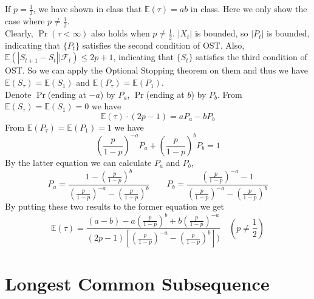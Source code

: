 \documentclass[12pt,letterpaper]{article}
\begin{document}
\subsection{}
If $p=\frac{1}{2}$, we have shown in class that $\mathbb{E}(\tau)=ab$ in class.
Here we only show the case where $p\neq\frac{1}{2}$.\\
Clearly, $\Pr(\tau<\infty)$ also holds when $p\neq\frac{1}{2}$. 
$|X_t|$ is bounded, so $|P_t|$ is bounded,
indicating that $\{P_t\}$ satisfies the second condition of OST.
Also, $\mathbb{E}(|S_{t+1}-S_{t}||\mathcal{F}_t)\leq 2p+1$,
indicating that $\{S_t\}$ satisfies the third condition of OST.
So we can apply the Optional Stopping theorem on them and thus we have
$\mathbb{E}(S_{\tau})=\mathbb{E}(S_{1})$ and $\mathbb{E}(P_{\tau})=\mathbb{E}(P_{1})$.\\
Denote $\Pr$(ending at $-a$) by $P_a$, $\Pr$(ending at $b$) by $P_b$.
From $\mathbb{E}(S_{\tau})=\mathbb{E}(S_{1})=0$ we have 
$$\mathbb{E}(\tau)\cdot(2p-1)=aP_a-bP_b$$
From $\mathbb{E}(P_{\tau})=\mathbb{E}(P_{1})=1$ we have
$$\left(\frac{p}{1-p}\right)^{-a}P_a+\left(\frac{p}{1-p}\right)^{b}P_b=1$$
By the latter equation we can calculate $P_a$ and $P_b$,
$$P_a=\frac{1-\left(\frac{p}{1-p}\right)^b}{\left(\frac{p}{1-p}\right)^{-a}-\left(\frac{p}{1-p}\right)^b}\qquad
P_b=\frac{\left(\frac{p}{1-p}\right)^{-a}-1}{\left(\frac{p}{1-p}\right)^{-a}-\left(\frac{p}{1-p}\right)^b}$$
By putting these two results to the former equation we get
$$\mathbb{E}(\tau)=\frac{(a-b)-a\left(\frac{p}{1-p}\right)^b+b\left(\frac{p}{1-p}\right)^{-a}}
{(2p-1)\left[\left(\frac{p}{1-p}\right)^{-a}-\left(\frac{p}{1-p}\right)^b\right])} \quad (p\neq\frac{1}{2})$$

\section{Longest Common Subsequence}

\subsection{}

\subsection{}
\end{document}
